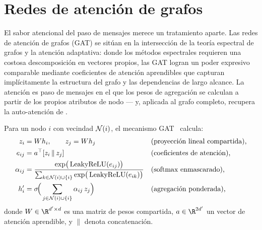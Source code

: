 \section{Redes de atenci\'on de grafos}
\label{sec:graphs:gat}

El sabor atencional del paso de mensajes merece un tratamiento aparte. Las redes
de atenci\'on de grafos (GAT) se sit\'uan en la intersecci\'on de la teor\'ia
espectral de grafos y la atenci\'on adaptativa: donde los m\'etodos espectrales
requieren una costosa descomposici\'on en vectores propios, las GAT logran un
poder expresivo comparable mediante coeficientes de atenci\'on aprendibles que
capturan impl\'icitamente la estructura del grafo y las dependencias de largo
alcance. La atenci\'on es paso de mensajes en el que los pesos de agregaci\'on se
calculan a partir de los propios atributos de nodo --- y, aplicada al grafo
completo, recupera la auto-atenci\'on de .

\begin{definition}
\label{def:graphs:gat}
Para un nodo $i$ con vecindad $\mathcal{N}(i)$, el mecanismo
GAT~\citep{velickovic2017graph} calcula:
\begin{align}
  z_i &= W h_i, \qquad z_j = W h_j
    && \text{(proyecci\'on lineal compartida),} \\
  e_{ij} &= a^\top [z_i \,\|\, z_j]
    && \text{(coeficientes de atenci\'on),} \\
  \alpha_{ij} &= \frac{\exp\!\big(\operatorname{LeakyReLU}(e_{ij})\big)}
       {\sum_{k \in \mathcal{N}(i) \cup \{i\}} \exp\!\big(\operatorname{LeakyReLU}(e_{ik})\big)}
    && \text{(softmax enmascarado),} \\
  h_i' &= \sigma\!\Big(\sum_{j \in \mathcal{N}(i) \cup \{i\}} \alpha_{ij}\, z_j\Big)
    && \text{(agregaci\'on ponderada),}
\end{align}
donde $W \in \R^{d' \times d}$ es una matriz de pesos compartida,
$a \in \R^{2d'}$ un vector de atenci\'on aprendible, y $\|$ denota
concatenaci\'on.
\end{definition}

